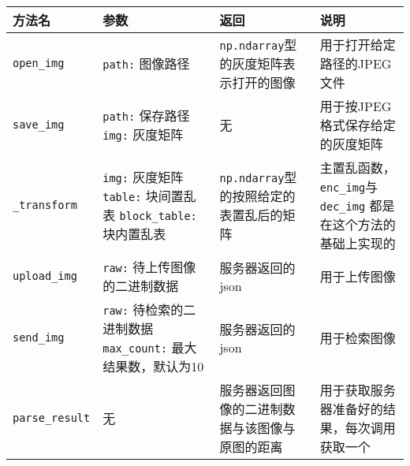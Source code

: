\begin{center}
  \begin{tabular}{| l | p{3.5cm} | p{3cm} | p{4cm} |}
    \hline
    方法名 & 参数 & 返回 & 说明 \\
    \hline
    \texttt{open\_img} & \texttt{path:} 图像路径
  & \texttt{np.ndarray}型的灰度矩阵表示打开的图像 & 用于打开给定路径的JPEG文件 \\
    \hline
    \texttt{save\_img} & \texttt{path:} 保存路径\newline
    \texttt{img:} 灰度矩阵 & 无 & 用于按JPEG格式保存给定的灰度矩阵 \\
    \hline
    \texttt{\_transform} & \texttt{img:} 灰度矩阵\newline
                           \texttt{table:} 块间置乱表\newline
                           \texttt{block\_table:} 块内置乱表\newline
  & \texttt{np.ndarray}型的按照给定的表置乱后的矩阵 & 主置乱函数，\newline
    \texttt{enc\_img}与\texttt{dec\_img}\newline
    都是在这个方法的基础上实现的 \\
    \hline
    \texttt{upload\_img} & \texttt{raw:} 待上传图像的二进制数据
  & 服务器返回的json & 用于上传图像 \\
    \hline
    \texttt{send\_img} & \texttt{raw:} 待检索的二进制数据\newline
                         \texttt{max\_count:} 最大结果数，默认为10
  & 服务器返回的json & 用于检索图像 \\
    \hline
    \texttt{parse\_result} & 无 & 服务器返回图像的二进制数据与该图像与
    原图的距离 & 用于获取服务器准备好的结果，每次调用获取一个 \\
    \hline
  \end{tabular}
\end{center}

